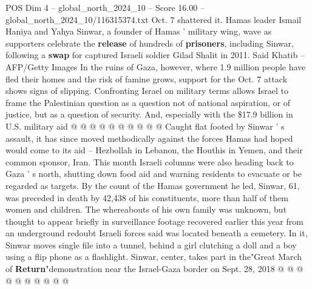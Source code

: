 \begin{textsample}{POS Dim 4 – global\_north\_2024\_10 – Score 16.00 – global\_north\_2024\_10/116315374.txt}
Oct. 7 shattered it.
Hamas leader Ismail Haniya and Yahya Sinwar, a founder of Hamas ' military wing, wave as supporters celebrate the \textbf{release} of hundreds of \textbf{prisoners}, including Sinwar, following a \textbf{swap} for captured Israeli soldier Gilad Shalit in 2011.
Said Khatib -- AFP/Getty Images In the ruins of Gaza, however, where 1.9 million people have fled their homes and the risk of famine grows, support for the Oct. 7 attack shows signs of slipping.
Confronting Israel on military terms allows Israel to frame the Palestinian question as a question not of national aspiration, or of justice, but as a question of security.
And, especially with the \$17.9 billion in U.S. military aid @ @ @ @ @ @ @ @ @ @ Caught flat footed by Sinwar ' s assault, it has since moved methodically against the forces Hamas had hoped would come to its aid -- Hezbollah in Lebanon, the Houthis in Yemen, and their common sponsor, Iran.
This month Israeli columns were also heading back to Gaza ' s north, shutting down food aid and warning residents to evacuate or be regarded as targets.
By the count of the Hamas government he led, Sinwar, 61, was preceded in death by 42,438 of his constituents, more than half of them women and children.
The whereabouts of his own family was unknown, but thought to appear briefly in surveillance footage recovered earlier this year from an underground redoubt Israeli forces said was located beneath a cemetery.
In it, Sinwar moves single file into a tunnel, behind a girl clutching a doll and a boy using a flip phone as a flashlight.
Sinwar, center, takes part in the"Great March of \textbf{Return}"demonstration near the Israel-Gaza border on Sept. 28, 2018 @ @ @ @ @ @ @ @ @ @

\end{textsample}
